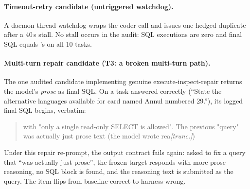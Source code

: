\paragraph{Timeout-retry candidate (untriggered watchdog).}
A daemon-thread watchdog wraps the coder call and issues one hedged
duplicate after a 40\,s stall. No stall occurs in the audit:
SQL executions are zero and final SQL equals \bare{}'s on all 10 tasks.

\paragraph{Multi-turn repair candidate (T3: a broken multi-turn
path).} The one audited candidate implementing genuine execute-inspect-repair
returns the model's \emph{prose} as final SQL. On a task \bare{} answered
correctly (``State the alternative languages available for card named Annul
numbered 29.''), its logged final SQL begins, verbatim:
\begin{quote}\small\ttfamily
with "only a single read-only SELECT is allowed". The previous "query" was
actually just prose text (the model wrote rea\emph{[trunc.]})
\end{quote}
Under this repair re-prompt, the output contract fails again: asked to fix a query that ``was
actually just prose'', the frozen target responds with more prose reasoning,
no SQL block is found, and the reasoning text is submitted as the query. The
item flips from baseline-correct to harness-wrong.

\FloatBarrier
